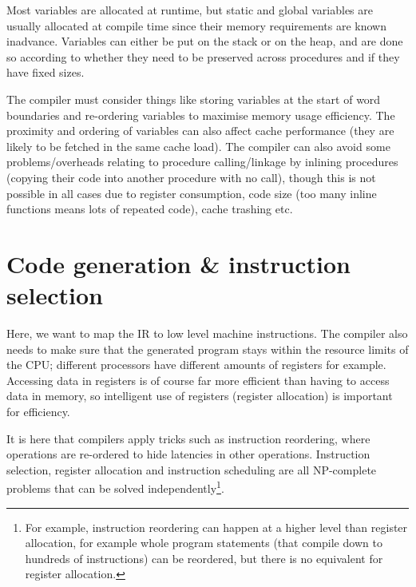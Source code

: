 Most variables are allocated at runtime, but static and global
variables are usually allocated at compile time since their memory
requirements are known inadvance. Variables can either be put on the
stack or on the heap, and are done so according to whether they need
to be preserved across procedures and if they have fixed sizes.


The compiler must consider things like storing variables at the start
of word boundaries and re-ordering variables to maximise memory usage
efficiency. The proximity and ordering of variables can also affect
cache performance (they are likely to be fetched in the same cache
load). The compiler can also avoid some problems/overheads relating to
procedure calling/linkage by inlining procedures (copying their code
into another procedure with no call), though this is not possible in
all cases due to register consumption, code size (too many inline
functions means lots of repeated code), cache trashing etc.




\section{Code generation \& instruction selection}

Here, we want to map the IR to low level machine instructions. The
compiler also needs to make sure that the generated program stays
within the resource limits of the CPU; different processors have
different amounts of registers for example. Accessing data in
registers is of course far more efficient than having to access data
in memory, so intelligent use of registers (register allocation) is
important for efficiency.

It is here that compilers apply tricks such as instruction reordering,
where operations are re-ordered to hide latencies in other
operations. Instruction selection, register allocation and instruction
scheduling are all NP-complete problems that can be solved
independently\footnote{For example, instruction reordering can happen
at a higher level than register allocation, for example whole program
statements (that compile down to hundreds of instructions) can be
reordered, but there is no equivalent for register allocation.}.

